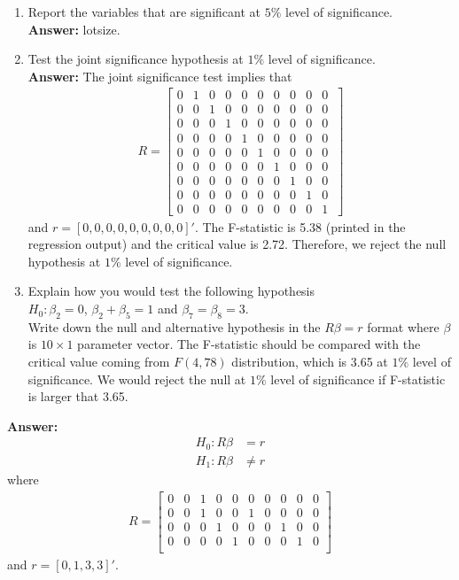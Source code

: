 \documentclass[12pt,a4paper]{article}
\begin{document}
\begin{enumerate}
\item{Report the variables that are significant at $5\%$ level of significance.}\\

{\bf Answer:} lotsize.
\item{Test the joint significance hypothesis at $1\%$ level of significance.}\\

{\bf Answer:} The joint significance test implies that
\begin{align*}
R=\begin{bmatrix}
0 & 1& 0 & 0 & 0 & 0 & 0 & 0 & 0 &0 \\
0 & 0& 1 & 0 & 0 & 0 & 0 & 0 & 0 &0 \\
0 & 0& 0 & 1 & 0 & 0 & 0 & 0 & 0 &0 \\
0 & 0& 0 & 0 & 1 & 0 & 0 & 0 & 0 &0 \\
0 & 0& 0 & 0 & 0 & 1 & 0 & 0 & 0 &0 \\
0 & 0& 0 & 0 & 0 & 0 & 1 & 0 & 0 &0 \\
0 & 0& 0 & 0 & 0 & 0 & 0 & 1 & 0 &0 \\
0 & 0& 0 & 0 & 0 & 0 & 0 & 0 & 1 &0 \\
0 & 0& 0 & 0 & 0 & 0 & 0 & 0 & 0 &1 \
\end{bmatrix}
\end{align*}
and $r=[0,0,0,0,0,0,0,0,0]'$. The F-statistic is 5.38 (printed in the regression output) and the critical value is 2.72. Therefore, we reject the null hypothesis at $1\%$ level of significance.\\

\item{Explain how you would test the following hypothesis}\\
$H_{0}: \beta_{2}=0$, $\beta_{2}+\beta_{5}=1$ and $\beta_{7}=\beta_{8}=3$.\\

Write down the null and alternative hypothesis in the $R\beta=r$ format where $\beta$ is $10 \times 1$ parameter vector. The F-statistic should be compared with the critical value coming from $F(4,78)$ distribution, which is 3.65 at $1\%$ level of significance. We would reject the null at $1\%$ level of significance if F-statistic is larger that 3.65.
\end{enumerate}

{\bf Answer:}
\begin{align*}
H_{0}:R\beta&=r\\
H_{1}: R\beta &\neq r
\end{align*}
where
\begin{align*}
R=
\begin{bmatrix}
0 & 0& 1 & 0 & 0 & 0 & 0 & 0 & 0 &0 \\
0 & 0& 1 & 0 & 0 & 1 & 0 & 0 & 0 &0 \\
0 & 0& 0 & 1 & 0 & 0 & 0 & 1 & 0 &0 \\
0 & 0& 0 & 0 & 1 & 0 & 0 & 0 & 1 &0 \\
\end{bmatrix}
\end{align*}
and $r=[0,1 ,3,3]'.$
\end{document}
